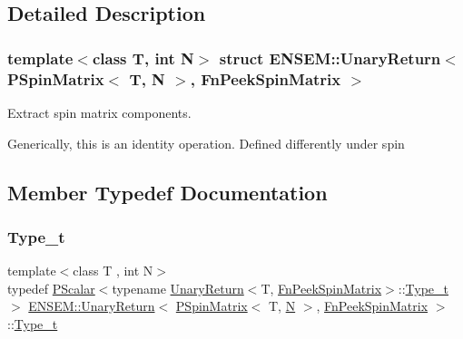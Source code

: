 \subsection{Detailed Description}
\subsubsection*{template$<$class T, int N$>$\newline
struct E\+N\+S\+E\+M\+::\+Unary\+Return$<$ P\+Spin\+Matrix$<$ T, N $>$, Fn\+Peek\+Spin\+Matrix $>$}

Extract spin matrix components. 

Generically, this is an identity operation. Defined differently under spin 

\subsection{Member Typedef Documentation}
\mbox{\label{structENSEM_1_1UnaryReturn_3_01PSpinMatrix_3_01T_00_01N_01_4_00_01FnPeekSpinMatrix_01_4_a1a718fe587d03e5619b75af54e2a19a3}} 
\subsubsection{\texorpdfstring{Type\_t}{Type\_t}\hspace{0.1cm}{\footnotesize\ttfamily [1/3]}}
{\footnotesize\ttfamily template$<$class T , int N$>$ \\
typedef \mbox{\hyperlink{classENSEM_1_1PScalar}{P\+Scalar}}$<$typename \mbox{\hyperlink{structENSEM_1_1UnaryReturn}{Unary\+Return}}$<$T, \mbox{\hyperlink{structENSEM_1_1FnPeekSpinMatrix}{Fn\+Peek\+Spin\+Matrix}}$>$\+::\mbox{\hyperlink{structENSEM_1_1UnaryReturn_3_01PSpinMatrix_3_01T_00_01N_01_4_00_01FnPeekSpinMatrix_01_4_a1a718fe587d03e5619b75af54e2a19a3}{Type\+\_\+t}}$>$ \mbox{\hyperlink{structENSEM_1_1UnaryReturn}{E\+N\+S\+E\+M\+::\+Unary\+Return}}$<$ \mbox{\hyperlink{classENSEM_1_1PSpinMatrix}{P\+Spin\+Matrix}}$<$ T, \mbox{\hyperlink{adat__devel_2lib_2hadron_2operator__name__util_8cc_a7722c8ecbb62d99aee7ce68b1752f337}{N}} $>$, \mbox{\hyperlink{structENSEM_1_1FnPeekSpinMatrix}{Fn\+Peek\+Spin\+Matrix}} $>$\+::\mbox{\hyperlink{structENSEM_1_1UnaryReturn_3_01PSpinMatrix_3_01T_00_01N_01_4_00_01FnPeekSpinMatrix_01_4_a1a718fe587d03e5619b75af54e2a19a3}{Type\+\_\+t}}}

